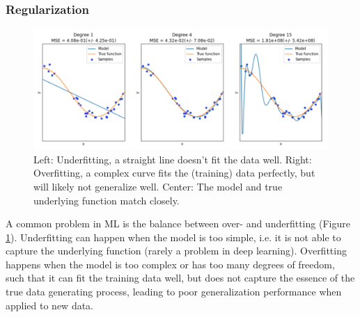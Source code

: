 \subsubsection{Regularization}
\begin{figure}[h]
    \centering
    \includegraphics[width=1.2\textwidth]{chapters/NLP/figures/over_and_underfitting.png}
    \caption{Left: Underfitting, a straight line doesn't fit  the data well.
    Right: Overfitting, a complex curve fits the (training) data perfectly, but will likely not generalize well.
    Center: The model and true underlying function match closely.}
    \label{fig:over_and_underfitting}
\end{figure}
A common problem in ML is the balance between over- and underfitting (Figure \ref{fig:over_and_underfitting}).
Underfitting can happen when the model is too simple, i.e. it is not able to capture the underlying function (rarely a problem in deep learning).
Overfitting happens when the model is too complex or has too many degrees of freedom, such that it can fit the training data well, but does not capture the essence of the true data generating process, leading to poor generalization performance when applied to new data.

